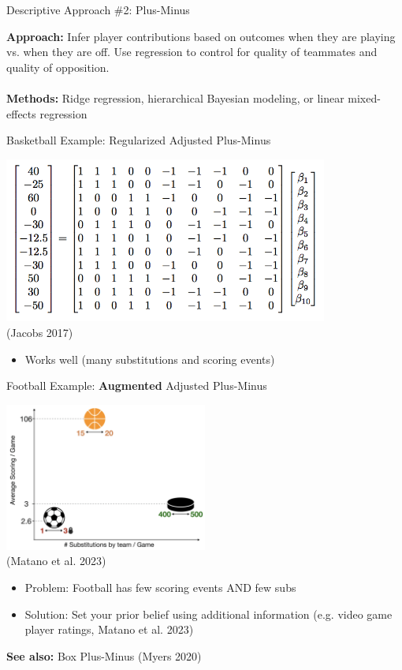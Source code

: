 \documentclass[handout]{beamer}
\begin{document}
\begin{frame}{Descriptive Approach \#2: Plus-Minus}

  {\bf Approach:} Infer player contributions based on outcomes when they are playing vs. when they are off. Use regression to control for quality of teammates and quality of opposition.\\
  ~\\
  {\bf Methods:} Ridge regression, hierarchical Bayesian modeling, or linear mixed-effects regression
\end{frame}


\begin{frame}{Basketball Example: Regularized Adjusted Plus-Minus}
  \begin{center}
    \includegraphics[width = 0.8\textwidth]{images/rapm.png}\\
    {\scriptsize\color{gray} (Jacobs 2017)}
  \end{center}
  \begin{itemize}
     \item Works well (many substitutions and scoring events)
  \end{itemize}
\end{frame}


\begin{frame}{Football Example: {\bf Augmented} Adjusted Plus-Minus}
  \begin{center}
    \includegraphics[width = 0.5\textwidth]{images/aapm.png}\\
    {\scriptsize\color{gray} (Matano et al. 2023)}
    \begin{itemize}
       \item Problem: Football has few scoring events AND few subs
       \item Solution: Set your prior belief using additional information (e.g. video game player ratings, Matano et al. 2023)
    \end{itemize}
  \end{center}
  {\bf See also:} Box Plus-Minus (Myers 2020)
\end{frame}
\end{document}
